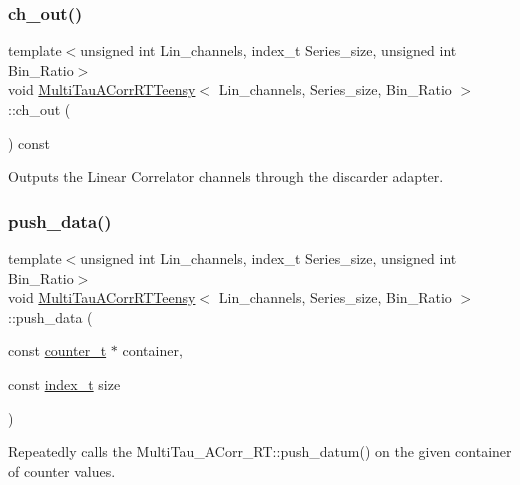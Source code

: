 \subsubsection{\texorpdfstring{ch\+\_\+out()}{ch\_out()}}
{\footnotesize\ttfamily template$<$unsigned int Lin\+\_\+channels, index\+\_\+t Series\+\_\+size, unsigned int Bin\+\_\+\+Ratio$>$ \\
void \hyperlink{classMultiTauACorrRTTeensy}{Multi\+Tau\+A\+Corr\+R\+T\+Teensy}$<$ Lin\+\_\+channels, Series\+\_\+size, Bin\+\_\+\+Ratio $>$\+::ch\+\_\+out (\begin{DoxyParamCaption}{ }\end{DoxyParamCaption}) const\hspace{0.3cm}{\ttfamily [inline]}}



Outputs the Linear Correlator channels through the discarder adapter. 

\mbox{\label{classMultiTauACorrRTTeensy_ad3c078b834bb1682c93ba4cd5639d450}} 
\subsubsection{\texorpdfstring{push\+\_\+data()}{push\_data()}}
{\footnotesize\ttfamily template$<$unsigned int Lin\+\_\+channels, index\+\_\+t Series\+\_\+size, unsigned int Bin\+\_\+\+Ratio$>$ \\
void \hyperlink{classMultiTauACorrRTTeensy}{Multi\+Tau\+A\+Corr\+R\+T\+Teensy}$<$ Lin\+\_\+channels, Series\+\_\+size, Bin\+\_\+\+Ratio $>$\+::push\+\_\+data (\begin{DoxyParamCaption}\item[{const \hyperlink{types_8hpp_a22f279793847eba127de149437848c48}{counter\+\_\+t} $\ast$}]{container,  }\item[{const \hyperlink{types_8hpp_ab41b824af8e088d090c0b9e60f536c9d}{index\+\_\+t}}]{size }\end{DoxyParamCaption})\hspace{0.3cm}{\ttfamily [inline]}}



Repeatedly calls the Multi\+Tau\+\_\+\+A\+Corr\+\_\+\+R\+T\+::push\+\_\+datum() on the given container of counter values. 

